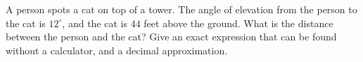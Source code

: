 A person spots a cat on top of a tower. The angle of elevation from the person to the cat is $12^\circ$, and the cat is $44$ feet above the ground. What is the distance between the person and the cat? Give an exact expression that can be found without a calculator, and a decimal approximation.
